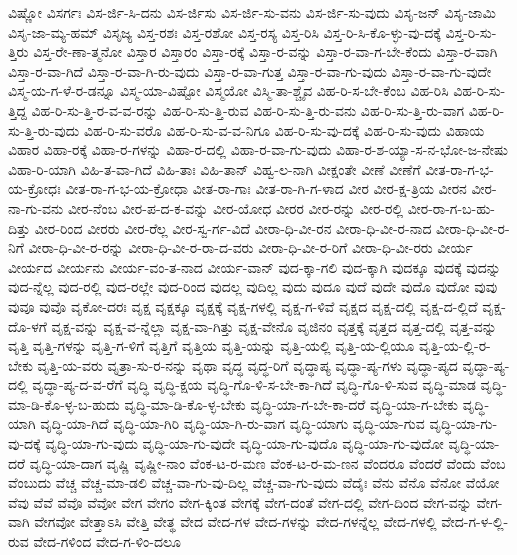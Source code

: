 {ವಿಷ್ಣೋ
ವಿಸರ್ಗಃ
ವಿಸ-ರ್ಜಿ-ಸಿ-ದನು
ವಿಸ-ರ್ಜಿಸು
ವಿಸ-ರ್ಜಿ-ಸು-ವನು
ವಿಸ-ರ್ಜಿ-ಸು-ವುದು
ವಿಸೃ-ಜನ್
ವಿಸೃ-ಜಾಮಿ
ವಿಸೃ-ಜಾ-ಮ್ಯ-ಹಮ್
ವಿಸೃಜ್ಯ
ವಿಸ್ತ-ರಶಃ
ವಿಸ್ತ-ರಶೋ
ವಿಸ್ತ-ರಸ್ಯ
ವಿಸ್ತ-ರಿಸಿ
ವಿಸ್ತ-ರಿ-ಸಿ-ಕೊ-ಳ್ಳು-ವು-ದಕ್ಕೆ
ವಿಸ್ತ-ರಿ-ಸು-ತ್ತಿರು
ವಿಸ್ತ-ರೇ-ಣಾ-ತ್ಮನೋ
ವಿಸ್ತಾರ
ವಿಸ್ತಾರಂ
ವಿಸ್ತಾ-ರಕ್ಕೆ
ವಿಸ್ತಾ-ರ-ವನ್ನು
ವಿಸ್ತಾ-ರ-ವಾ-ಗ-ಬೇ-ಕೆಂದು
ವಿಸ್ತಾ-ರ-ವಾಗಿ
ವಿಸ್ತಾ-ರ-ವಾ-ಗಿದೆ
ವಿಸ್ತಾ-ರ-ವಾ-ಗಿ-ರು-ವುದು
ವಿಸ್ತಾ-ರ-ವಾ-ಗುತ್ತ
ವಿಸ್ತಾ-ರ-ವಾ-ಗು-ವುದು
ವಿಸ್ತಾ-ರ-ವಾ-ಗು-ವುದೇ
ವಿಸ್ಮ-ಯ-ಗ-ಳೆ-ರ-ಡನ್ನೂ
ವಿಸ್ಮ-ಯಾ-ವಿಷ್ಟೋ
ವಿಸ್ಮಯೋ
ವಿಸ್ಮಿ-ತಾ-ಶ್ಚೈವ
ವಿಹ-ರಿ-ಸ-ಬೇ-ಕೆಂಬ
ವಿಹ-ರಿಸಿ
ವಿಹ-ರಿ-ಸು-ತ್ತಿದ್ದ
ವಿಹ-ರಿ-ಸು-ತ್ತಿ-ರ-ವ-ವ-ರನ್ನು
ವಿಹ-ರಿ-ಸು-ತ್ತಿ-ರುವ
ವಿಹ-ರಿ-ಸು-ತ್ತಿ-ರು-ವನು
ವಿಹ-ರಿ-ಸು-ತ್ತಿ-ರು-ವಾಗ
ವಿಹ-ರಿ-ಸು-ತ್ತಿ-ರು-ವುದು
ವಿಹ-ರಿ-ಸು-ವರೊ
ವಿಹ-ರಿ-ಸು-ವ-ವ-ನಿಗೂ
ವಿಹ-ರಿ-ಸು-ವು-ದಕ್ಕೆ
ವಿಹ-ರಿ-ಸು-ವುದು
ವಿಹಾಯ
ವಿಹಾರ
ವಿಹಾ-ರಕ್ಕೆ
ವಿಹಾ-ರ-ಗಳನ್ನು
ವಿಹಾ-ರ-ದಲ್ಲಿ
ವಿಹಾ-ರ-ವಾ-ಗು-ವುದು
ವಿಹಾ-ರ-ಶ-ಯ್ಯಾ-ಸ-ನ-ಭೋ-ಜ-ನೇಷು
ವಿಹಾ-ರಿ-ಯಾಗಿ
ವಿಹಿ-ತ-ವಾ-ಗಿದೆ
ವಿಹಿ-ತಾಃ
ವಿಹಿ-ತಾನ್
ವಿಹ್ವ-ಲ-ನಾಗಿ
ವೀಕ್ಷಂತೇ
ವೀಣೆ
ವೀಣೆಗೆ
ವೀತ-ರಾ-ಗ-ಭ-ಯ-ಕ್ರೋಧಃ
ವೀತ-ರಾ-ಗ-ಭ-ಯ-ಕ್ರೋಧಾ
ವೀತ-ರಾ-ಗಾಃ
ವೀತ-ರಾ-ಗಿ-ಗ-ಳಾದ
ವೀರ
ವೀರ-ಕ್ಷ-ತ್ರಿಯ
ವೀರನ
ವೀರ-ನಾ-ಗು-ವನು
ವೀರ-ನೆಂಬ
ವೀರ-ಪ-ದ-ಕ-ವನ್ನು
ವೀರ-ಯೋಧ
ವೀರರ
ವೀರ-ರನ್ನು
ವೀರ-ರಲ್ಲಿ
ವೀರ-ರಾ-ಗ-ಬ-ಹು-ದಿತ್ತು
ವೀರ-ರಿಂದ
ವೀರರು
ವೀರ-ರೆಲ್ಲ
ವೀರ-ಸ್ವ-ರ್ಗ-ವಿದೆ
ವೀರಾ-ಧಿ-ವೀ-ರನ
ವೀರಾ-ಧಿ-ವೀ-ರ-ನಾದ
ವೀರಾ-ಧಿ-ವೀ-ರ-ನಿಗೆ
ವೀರಾ-ಧಿ-ವೀ-ರ-ರನ್ನು
ವೀರಾ-ಧಿ-ವೀ-ರ-ರಾ-ದ-ವರು
ವೀರಾ-ಧಿ-ವೀ-ರ-ರಿಗೆ
ವೀರಾ-ಧಿ-ವೀ-ರರು
ವೀರ್ಯ
ವೀರ್ಯದ
ವೀರ್ಯನು
ವೀರ್ಯ-ವಂ-ತ-ನಾದ
ವೀರ್ಯ-ವಾನ್
ವುದ-ಕ್ಕಾ-ಗಲಿ
ವುದ-ಕ್ಕಾಗಿ
ವುದಕ್ಕೂ
ವುದಕ್ಕೆ
ವುದನ್ನು
ವುದ-ನ್ನೆಲ್ಲ
ವುದ-ರಲ್ಲಿ
ವುದ-ರಲ್ಲೇ
ವುದ-ರಿಂದ
ವುದಲ್ಲ
ವುದಿಲ್ಲ
ವುದು
ವುದೂ
ವುದೆ
ವುದೇ
ವುದೊ
ವುದೋ
ವುವು
ವುವೂ
ವುವೊ
ವೃಕೋ-ದರಃ
ವೃಕ್ಷ
ವೃಕ್ಷಕ್ಕೂ
ವೃಕ್ಷಕ್ಕೆ
ವೃಕ್ಷ-ಗಳಲ್ಲಿ
ವೃಕ್ಷ-ಗ-ಳಿವೆ
ವೃಕ್ಷದ
ವೃಕ್ಷ-ದಲ್ಲಿ
ವೃಕ್ಷ-ದ-ಲ್ಲಿದೆ
ವೃಕ್ಷ-ದೊ-ಳಗೆ
ವೃಕ್ಷ-ವನ್ನು
ವೃಕ್ಷ-ವ-ನ್ನೆಲ್ಲಾ
ವೃಕ್ಷ-ವಾ-ಗಿತ್ತು
ವೃಕ್ಷ-ವೇನೊ
ವೃಜಿನಂ
ವೃತ್ತಕ್ಕೆ
ವೃತ್ತದ
ವೃತ್ತ-ದಲ್ಲಿ
ವೃತ್ತ-ವನ್ನು
ವೃತ್ತಿ
ವೃತ್ತಿ-ಗಳನ್ನು
ವೃತ್ತಿ-ಗ-ಳಿಗೆ
ವೃತ್ತಿಗೆ
ವೃತ್ತಿಯ
ವೃತ್ತಿ-ಯನ್ನು
ವೃತ್ತಿ-ಯಲ್ಲಿ
ವೃತ್ತಿ-ಯ-ಲ್ಲಿಯೂ
ವೃತ್ತಿ-ಯ-ಲ್ಲಿ-ರ-ಬೇಕು
ವೃತ್ತಿ-ಯ-ವರು
ವೃತ್ರಾ-ಸು-ರ-ನನ್ನು
ವೃಥಾ
ವೃದ್ಧ
ವೃದ್ಧ-ರಿಗೆ
ವೃದ್ಧಾಪ್ಯ
ವೃದ್ಧಾ-ಪ್ಯ-ಗಳು
ವೃದ್ಧಾ-ಪ್ಯದ
ವೃದ್ಧಾ-ಪ್ಯ-ದಲ್ಲಿ
ವೃದ್ಧಾ-ಪ್ಯ-ದ-ವ-ರೆಗೆ
ವೃದ್ಧಿ
ವೃದ್ಧಿ-ಕ್ಷಯ
ವೃದ್ಧಿ-ಗೊ-ಳಿ-ಸ-ಬೇ-ಕಾ-ಗಿದೆ
ವೃದ್ಧಿ-ಗೊ-ಳಿ-ಸುವ
ವೃದ್ಧಿ-ಮಾಡ
ವೃದ್ಧಿ-ಮಾ-ಡಿ-ಕೊ-ಳ್ಳ-ಬ-ಹುದು
ವೃದ್ಧಿ-ಮಾ-ಡಿ-ಕೊ-ಳ್ಳ-ಬೇಕು
ವೃದ್ಧಿ-ಯಾ-ಗ-ಬೇ-ಕಾ-ದರೆ
ವೃದ್ಧಿ-ಯಾ-ಗ-ಬೇಕು
ವೃದ್ಧಿ-ಯಾಗಿ
ವೃದ್ಧಿ-ಯಾ-ಗಿದೆ
ವೃದ್ಧಿ-ಯಾ-ಗಿರಿ
ವೃದ್ಧಿ-ಯಾ-ಗಿ-ರು-ವಾಗ
ವೃದ್ಧಿ-ಯಾಗು
ವೃದ್ಧಿ-ಯಾ-ಗುವ
ವೃದ್ಧಿ-ಯಾ-ಗು-ವು-ದಕ್ಕೆ
ವೃದ್ಧಿ-ಯಾ-ಗು-ವುದು
ವೃದ್ಧಿ-ಯಾ-ಗು-ವುದೇ
ವೃದ್ಧಿ-ಯಾ-ಗು-ವುದೊ
ವೃದ್ಧಿ-ಯಾ-ಗು-ವುದೋ
ವೃದ್ಧಿ-ಯಾ-ದರೆ
ವೃದ್ಧಿ-ಯಾ-ದಾಗ
ವೃಷ್ಣಿ
ವೃಷ್ಣೀ-ನಾಂ
ವೆಂಕ-ಟ-ರ-ಮಣ
ವೆಂಕ-ಟ-ರ-ಮ-ಣನ
ವೆಂದರೂ
ವೆಂದರೆ
ವೆಂದು
ವೆಂಬ
ವೆಂಬುದು
ವೆಚ್ಚ
ವೆಚ್ಚ-ಮಾ-ಡಲಿ
ವೆಚ್ಚ-ವಾ-ಗು-ವು-ದಿಲ್ಲ
ವೆಚ್ಚ-ವಾ-ಗು-ವುದು
ವೆದೈಃ
ವೆನು
ವೆನೊ
ವೆನೋ
ವೆಯೋ
ವೆವು
ವೆವೆ
ವೆವೊ
ವೆವೋ
ವೇಗ
ವೇಗಂ
ವೇಗ-ಕ್ಕಿಂತ
ವೇಗಕ್ಕೆ
ವೇಗ-ದಂತೆ
ವೇಗ-ದಲ್ಲಿ
ವೇಗ-ದಿಂದ
ವೇಗ-ವನ್ನು
ವೇಗ-ವಾಗಿ
ವೇಗವೋ
ವೇತ್ತಾಽಸಿ
ವೇತ್ತಿ
ವೇತ್ಥ
ವೇದ
ವೇದ-ಗಳ
ವೇದ-ಗಳನ್ನು
ವೇದ-ಗಳನ್ನೆಲ್ಲ
ವೇದ-ಗಳಲ್ಲಿ
ವೇದ-ಗ-ಳ-ಲ್ಲಿ-ರುವ
ವೇದ-ಗಳಿಂದ
ವೇದ-ಗ-ಳಿಂ-ದಲೂ
}
